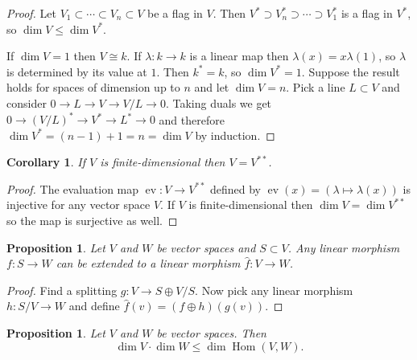 \documentclass[11pt]{article}
\newtheorem{prop}[theo]{Proposition}
\newtheorem{coro}[theo]{Corollary}
\theoremstyle{definition}
\DeclareMathOperator{\Hom}{Hom}
\begin{document}
\begin{proof}
Let $V_1 \subset \cdots \subset V_n \subset V$ be a flag in $V$.
Then $V^* \supset V_n^* \supset \cdots \supset V_1^*$ is a flag in $V^*$, so $\dim V \leq \dim V^*$.

If $\dim V = 1$ then $V \cong k$.
If $\lambda : k \to k$ is a linear map then $\lambda(x) = x \lambda (1)$, so $\lambda$ is determined by its value at $1$.
Then $k^* = k$, so $\dim V^* = 1$.
Suppose the result holds for spaces of dimension up to $n$ and let $\dim V = n$.
Pick a line $L \subset V$ and consider $0 \to L \to V \to V/L \to 0$.
Taking duals we get $0 \to (V/L)^* \to V^* \to L^* \to 0$ and therefore $\dim V^* = (n-1) + 1 = n = \dim V$ by induction.
\end{proof}


\begin{coro}
If $V$ is finite-dimensional then $V = V^{**}$.
\end{coro}

\begin{proof}
The evaluation map $\operatorname{ev}: V \to V^{**}$ defined by $\operatorname{ev}(x) = (\lambda \mapsto \lambda(x))$ is injective for any vector space $V$.
If $V$ is finite-dimensional then $\dim V = \dim V^{**}$ so the map is surjective as well.
\end{proof}



\begin{prop}
Let $V$ and $W$ be vector spaces and $S \subset V$.
Any linear morphism $f : S \to W$ can be extended to a linear morphism $\hat f : V \to W$.
\end{prop}

\begin{proof}
Find a splitting $g : V \to S \oplus V/S$.
Now pick any linear morphism $h : S/V \to W$ and define $\hat f(v) = (f \oplus h)(g(v))$.
\end{proof}


\begin{prop}
Let $V$ and $W$ be vector spaces.
Then
\[
\dim V \cdot \dim W \leq \dim \Hom(V, W).
\]
\end{prop}
\end{document}
